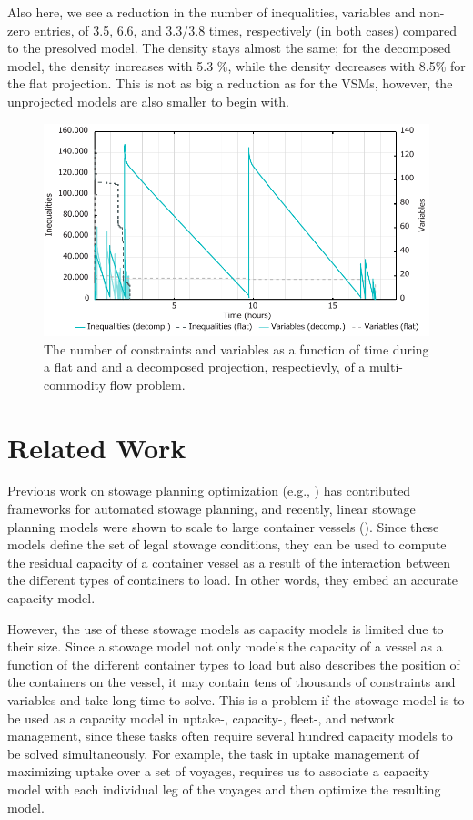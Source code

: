 Also here, we see a reduction in the number of inequalities, variables and non-zero entries, of 3.5, 6.6, and 3.3/3.8 times, respectively (in both cases) compared to the presolved model. The density stays almost the same; for the decomposed model, the density increases with 5.3 \%, while the density decreases with 8.5\% for the flat projection.
This is not as big a reduction as for the VSMs, however, the unprojected models are also smaller to begin with. 
\begin{figure}
	\centering
		\includegraphics[scale=0.7]{figures/multicomGraph2.pdf}
	\caption{The number of constraints and variables as a function of time during a flat and and a decomposed projection, respectievly, of a multi-commodity flow problem.}
	\label{fig:multicom}
\end{figure}


\section{Related Work}
\label{sec:preWork}
Previous work on stowage planning optimization (e.g., \cite{roach00,kimkang02,ambrosino04,low09,delgado09,pacino12}) has contributed frameworks for automated stowage planning, and recently, linear stowage planning models were shown to scale to large container vessels (\cite{pacino11,AlbertosThesis}). Since these models define the set of legal stowage conditions, they can be used to compute the residual capacity of a container vessel as a result of the interaction between the different types of containers to load. In other words, they embed an accurate capacity model. 

However, the use of these stowage models as capacity models is limited due to their size. Since a stowage model not only models the capacity of a vessel as a function of the different container types to load but also describes the position of the containers on the vessel, it may contain tens of thousands of constraints and variables and take long time to solve. This is a problem if the stowage model is to be used as a capacity model in uptake-, capacity-, fleet-, and network management, since these tasks often require several hundred capacity models to be solved simultaneously. For example, the task in uptake management of maximizing uptake over a set of voyages, requires us to associate a capacity model with each individual leg of the voyages and then optimize the resulting model.  

